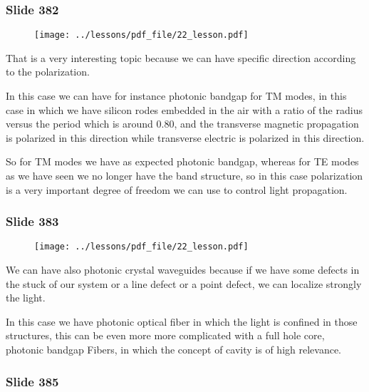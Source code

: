 \documentclass[../main/main.tex]{subfiles}
\begin{document}
\newpage

\subsubsection{Slide 382}

\begin{figure}[h!]
\centering
\texttt{[image: ../lessons/pdf\_file/22\_lesson.pdf]}
\end{figure}

That is a very interesting topic because we can have specific direction according to the polarization.

In this case we can have for instance photonic bandgap for TM modes, in this case in which we have silicon rodes embedded in the air with a ratio of the radius versus the period which is around 0.80, and the transverse magnetic propagation is polarized in this direction while transverse electric is polarized in this direction.

So for TM modes we have as expected photonic bandgap, whereas for TE modes as we have seen we no longer have the band structure, so in this case polarization is a very important degree of freedom we can use to control light propagation.

\newpage

\subsubsection{Slide 383}

\begin{figure}[h!]
\centering
\texttt{[image: ../lessons/pdf\_file/22\_lesson.pdf]}
\end{figure}

We can have also photonic crystal waveguides because if we have some defects in the stuck of our system or a line defect or a point defect, we can localize strongly the light. 

In this case we have photonic optical fiber in which the light is confined in those structures, this can be even more more complicated with a full hole core, photonic bandgap Fibers, in which the concept of cavity is of high relevance. 

\newpage

\subsubsection{Slide 385}
\end{document}
